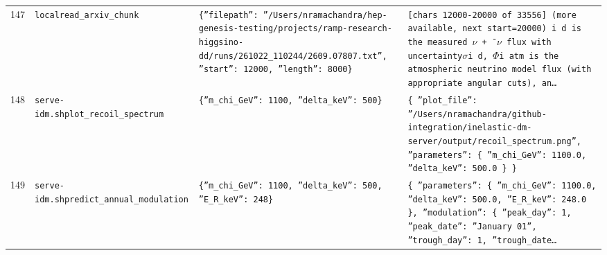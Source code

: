 \documentclass[11pt,a4paper]{article}
\begin{document}
\begin{longtable}{@{}p{}p{}p{}p{}@{}}
147 & \texttt{local}\newline\texttt{read\_\allowbreak{}arxiv\_\allowbreak{}chunk} & \texttt{\{''filepath'':\allowbreak{} ''/\allowbreak{}Users/\allowbreak{}nramachandra/\allowbreak{}hep-genesis-testing/\allowbreak{}projects/\allowbreak{}ramp-research-higgsino-dd/\allowbreak{}runs/\allowbreak{}261022\_\allowbreak{}110244/\allowbreak{}2609.07807.txt'',\allowbreak{} ''start'':\allowbreak{} 12000,\allowbreak{} ''length'':\allowbreak{} 8000\}\allowbreak{}} & \texttt{[chars 12000-20000 of 33556]\allowbreak{} (more available,\allowbreak{} next start=\allowbreak{}20000)\allowbreak{}  i d is the measured $\nu$ + ¯$\nu$ flux with uncertainty$\sigma$i d,\allowbreak{} $\Phi$i atm is the atmospheric neutrino model flux (with appropriate angular cuts)\allowbreak{},\allowbreak{} an\ldots{}\allowbreak{}} \\
148 & \texttt{serve-idm.sh}\newline\texttt{plot\_\allowbreak{}recoil\_\allowbreak{}spectrum} & \texttt{\{''m\_\allowbreak{}chi\_\allowbreak{}GeV'':\allowbreak{} 1100,\allowbreak{} ''delta\_\allowbreak{}keV'':\allowbreak{} 500\}\allowbreak{}} & \texttt{\{   ''plot\_\allowbreak{}file'':\allowbreak{} ''/\allowbreak{}Users/\allowbreak{}nramachandra/\allowbreak{}github-integration/\allowbreak{}inelastic-dm-server/\allowbreak{}output/\allowbreak{}recoil\_\allowbreak{}spectrum.png'',\allowbreak{}   ''parameters'':\allowbreak{} \{     ''m\_\allowbreak{}chi\_\allowbreak{}GeV'':\allowbreak{} 1100.0,\allowbreak{}     ''delta\_\allowbreak{}keV'':\allowbreak{} 500.0   \}\allowbreak{} \}\allowbreak{}} \\
149 & \texttt{serve-idm.sh}\newline\texttt{predict\_\allowbreak{}annual\_\allowbreak{}modulation} & \texttt{\{''m\_\allowbreak{}chi\_\allowbreak{}GeV'':\allowbreak{} 1100,\allowbreak{} ''delta\_\allowbreak{}keV'':\allowbreak{} 500,\allowbreak{} ''E\_\allowbreak{}R\_\allowbreak{}keV'':\allowbreak{} 248\}\allowbreak{}} & \texttt{\{   ''parameters'':\allowbreak{} \{     ''m\_\allowbreak{}chi\_\allowbreak{}GeV'':\allowbreak{} 1100.0,\allowbreak{}     ''delta\_\allowbreak{}keV'':\allowbreak{} 500.0,\allowbreak{}     ''E\_\allowbreak{}R\_\allowbreak{}keV'':\allowbreak{} 248.0   \}\allowbreak{},\allowbreak{}   ''modulation'':\allowbreak{} \{     ''peak\_\allowbreak{}day'':\allowbreak{} 1,\allowbreak{}     ''peak\_\allowbreak{}date'':\allowbreak{} ''January 01'',\allowbreak{}     ''trough\_\allowbreak{}day'':\allowbreak{} 1,\allowbreak{}     ''trough\_\allowbreak{}date\ldots{}\allowbreak{}} \\

\end{longtable}
\end{document}
